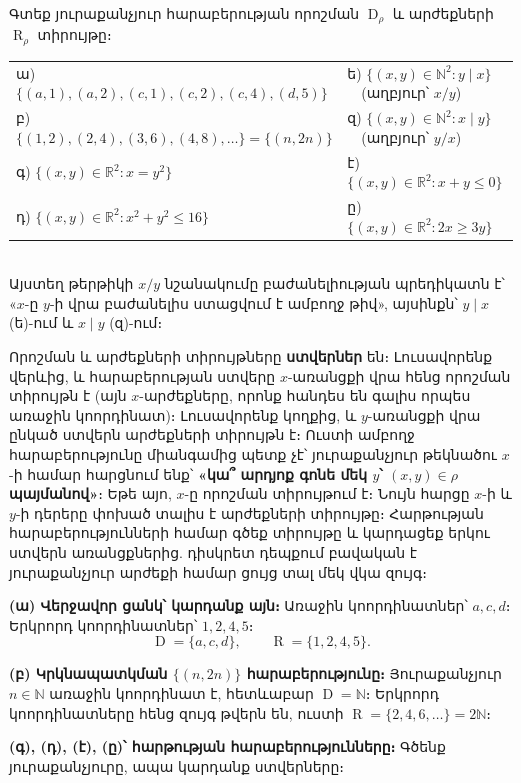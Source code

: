 \documentclass[11pt,a4paper]{article}
\newcommand{\R}{\mathbb{R}}
\newcommand{\N}{\mathbb{N}}
\DeclareMathOperator{\Dom}{D}
\DeclareMathOperator{\Ran}{R}
\begin{document}
\begin{problembox}[1.2]
Գտեք յուրաքանչյուր հարաբերության որոշման $\Dom_\rho$ և արժեքների $\Ran_\rho$ տիրույթը։
\\[2pt]
\begin{tabular}{@{}ll@{}}
ա) $\{(a,1),(a,2),(c,1),(c,2),(c,4),(d,5)\}$ &
ե) $\{(x,y)\in\N^2 : y\mid x\}$\ \ (աղբյուր՝ $x/y$)\\
բ) $\{(1,2),(2,4),(3,6),(4,8),\dots\}=\{(n,2n)\}$ &
զ) $\{(x,y)\in\N^2 : x\mid y\}$\ \ (աղբյուր՝ $y/x$)\\
գ) $\{(x,y)\in\R^2 : x=y^2\}$ &
է) $\{(x,y)\in\R^2 : x+y\le 0\}$\\
դ) $\{(x,y)\in\R^2 : x^2+y^2\le 16\}$ &
ը) $\{(x,y)\in\R^2 : 2x\ge 3y\}$
\end{tabular}
\\[3pt]
\footnotesize Այստեղ թերթիկի $x/y$ նշանակումը բաժանելիության պրեդիկատն է՝ «$x$-ը $y$-ի վրա բաժանելիս
ստացվում է ամբողջ թիվ», այսինքն՝ $y\mid x$ (ե)-ում և $x\mid y$ (զ)-ում։
\end{problembox}

\begin{ideabox}
Որոշման և արժեքների տիրույթները \textbf{ստվերներ} են։ Լուսավորենք վերևից, և հարաբերության ստվերը
$x$-առանցքի վրա հենց որոշման տիրույթն է (այն $x$-արժեքները, որոնք հանդես են գալիս որպես առաջին
կոորդինատ)։ Լուսավորենք կողքից, և $y$-առանցքի վրա ընկած ստվերն արժեքների տիրույթն է։ Ուստի ամբողջ
հարաբերությունը միանգամից պետք չէ՝ յուրաքանչյուր թեկնածու $x$-ի համար հարցնում ենք՝
\textbf{«կա՞ արդյոք գոնե մեկ $y$՝ $(x,y)\in\rho$ պայմանով»}։ Եթե այո, $x$-ը որոշման տիրույթում է։
Նույն հարցը $x$-ի և $y$-ի դերերը փոխած տալիս է արժեքների տիրույթը։ Հարթության հարաբերությունների
համար գծեք տիրույթը և կարդացեք երկու ստվերն առանցքներից. դիսկրետ դեպքում բավական է յուրաքանչյուր
արժեքի համար ցույց տալ մեկ վկա զույգ։
\end{ideabox}

\textbf{(ա) Վերջավոր ցանկ՝ կարդանք այն։}
Առաջին կոորդինատներ՝ $a,c,d$։ Երկրորդ կոորդինատներ՝ $1,2,4,5$։
\[\Dom=\{a,c,d\},\qquad \Ran=\{1,2,4,5\}.\]

\textbf{(բ) Կրկնապատկման $\{(n,2n)\}$ հարաբերությունը։}
Յուրաքանչյուր $n\in\N$ առաջին կոորդինատ է, հետևաբար $\Dom=\N$։ Երկրորդ կոորդինատները հենց զույգ թվերն
են, ուստի $\Ran=\{2,4,6,\dots\}=2\N$։

\textbf{(գ), (դ), (է), (ը)՝ հարթության հարաբերությունները։} Գծենք յուրաքանչյուրը, ապա կարդանք ստվերները։
\end{document}
